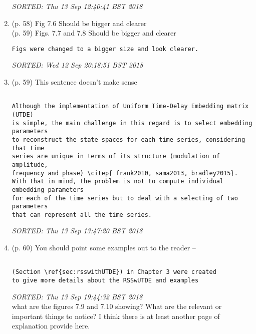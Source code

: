 \documentclass[10pt]{article}
\begin{document}
\begin{enumerate}[noitemsep,topsep=0pt]
\begin{verbatim}
\end{verbatim}
\textit{
SORTED: Thu 13 Sep 12:40:41 BST 2018
}
\\






\item (p. 58)  Fig 7.6 Should be bigger and clearer
	\\  (p. 59) Figs. 7.7 and 7.8 Should be bigger and clearer

\begin{verbatim}
Figs were changed to a bigger size and look clearer.
\end{verbatim}
\textit{
SORTED: 
Wed 12 Sep 20:18:51 BST 2018
}
\\





\item (p. 59) This sentence doesn't make sense


\begin{verbatim}

Although the implementation of Uniform Time-Delay Embedding matrix (UTDE) 
is simple, the main challenge in this regard is to select embedding parameters 
to reconstruct the state spaces for each time series, considering that time 
series are unique in terms of its structure (modulation of amplitude, 
frequency and phase) \citep{ frank2010, sama2013, bradley2015}.
With that in mind, the problem is not to compute individual embedding parameters 
for each of the time series but to deal with a selecting of two parameters 
that can represent all the time series. 

\end{verbatim}
\textit{
SORTED: 
Thu 13 Sep 13:47:20 BST 2018
}
\\





\item (p. 60) You should point some examples out to the reader -- 

\begin{verbatim}

(Section \ref{sec:rsswithUTDE}) in Chapter 3 were created 
to give more details about the RSSwUTDE and examples

\end{verbatim}
\textit{
SORTED: 
Thu 13 Sep 19:44:32 BST 2018
}
\\


	what are the figures 7.9 and 7.10 showing?
	What are the relevant or important things to notice?
	I think there is at least another page of explanation 
	provide here.



\end{enumerate}
\end{document}
